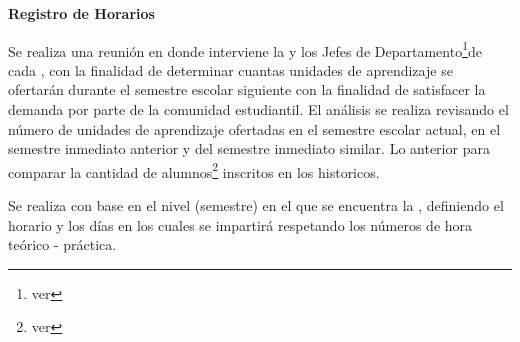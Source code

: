 \begin{PDescripcion}
	
	\Ppaso \textbf{Registro de Horarios}
	
	\begin{enumerate}
		\Ppaso[\PSubProceso]  Se realiza una reunión  en donde interviene la  y los Jefes de Departamento\footnote{ver }de cada , con la finalidad de determinar cuantas unidades de aprendizaje se ofertarán durante el semestre escolar siguiente con la finalidad de satisfacer la demanda por parte de la comunidad estudiantil. El análisis  se realiza revisando el número de unidades de aprendizaje ofertadas en el semestre escolar actual, en el semestre inmediato anterior y del semestre inmediato similar. Lo anterior para comparar la cantidad de alumnos\footnote{ver } inscritos en los historicos.
		
		
		
		
		
		
		\Ppaso[\PSubProceso]   Se realiza con base en el nivel (semestre) en el que se encuentra la , definiendo el horario y los días en los cuales se impartirá respetando los números de hora teórico - práctica.        
		

\end{enumerate}
\end{PDescripcion}

